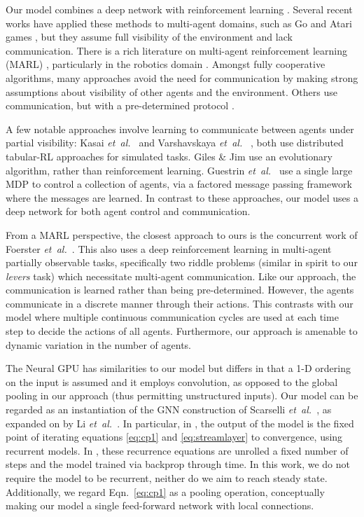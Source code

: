 \documentclass{article}
\def\etal{{\textit{et~al.~}}}
\begin{document}
Our model combines a deep network with reinforcement learning \cite{Guo14,Mnih15,levine15}. Several
recent works have applied these methods to multi-agent domains, such
as Go \cite{Maddison15,Silver16} and Atari games
\cite{Tampuu15}, but they assume full visibility of the environment and
lack communication. 
There is a rich literature on multi-agent reinforcement learning (MARL)
\cite{busoniu2008comprehensive}, particularly in the robotics domain
\cite{Matari97,Stone98,Fox00,Olfati07,Cao13}. Amongst fully cooperative algorithms, many approaches
\cite{Lauer00,littman2001value,wang2002reinforcement} avoid the need
for communication by making strong assumptions about visibility of
other agents and the environment. Others use communication, but with
a pre-determined protocol \cite{Tan93,Melo11,Zhang13,Maravall13}.

A few notable approaches involve learning to communicate between
agents under partial visibility: Kasai \etal \cite{Kasai08} and Varshavskaya \etal
\cite{Varshavskaya2009}, both use distributed tabular-RL
approaches for simulated tasks. Giles \& Jim \cite{Giles02} use an
evolutionary algorithm, rather than reinforcement learning. Guestrin \etal \cite{Guestrin01} use
a single large MDP to control a collection of agents, via a factored
message passing framework where the messages are learned. 
In contrast to these approaches, our model uses a deep network for both agent control and
communication.

From a MARL perspective, the closest approach to ours is the concurrent work
of Foerster \etal \cite{Foerster16}. This also uses a deep
reinforcement learning in multi-agent partially observable tasks,
specifically two riddle problems (similar in spirit to our {\it levers} task) which necessitate multi-agent
communication. Like our approach, the communication is learned rather
than being pre-determined. However, the agents communicate in
a discrete manner through their actions. This contrasts with our model
where multiple continuous communication cycles are used at each time
step to decide the actions of all agents. Furthermore, our approach is
amenable to dynamic variation in the number of agents.

The Neural GPU \cite{NeuralGPU} has similarities to our model but
differs in that a 1-D ordering on the input is assumed and it 
employs convolution, as opposed to the global pooling in our approach
(thus permitting unstructured inputs).
Our model can be regarded as an instantiation of the GNN construction of Scarselli
\etal \cite{GNN}, as expanded on by Li \etal \cite{GGSNN}.  In
particular, in \cite{GNN}, the output of the model is the fixed point
of iterating equations \eqref{eq:cp1} and \eqref{eq:streamlayer} to
convergence, using recurrent models. In \cite{GGSNN}, these recurrence
equations are unrolled a fixed number of steps and the model trained
via backprop through time. In this work, we do not require the model
to be recurrent, neither do we aim to reach steady state. Additionally, we regard
Eqn.~\eqref{eq:cp1} as a pooling operation, conceptually making our
model a single feed-forward network with local connections. 
\end{document}
